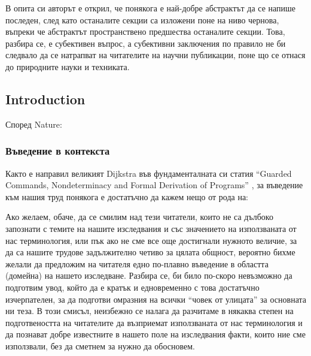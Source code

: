 \documentclass[11pt, oneside]{article}     %
\begin{document}
В опита си авторът е открил, че понякога е най-добре абстрактът да се напише последен, след като останалите секции са изложени поне на ниво чернова, въпреки че абстрактът пространствено предшества останалите секции. Това, разбира се, е субективен въпрос, а субективни заключения по правило не би следвало да се натрапват на читателите на научни публикации, поне що се отнася до природните науки и техниката.

\subsection*{Introduction}

Според Nature:\\

  \subsubsection*{Въведение в контекста}

  Както е направил великият Dijkstra във фундаменталната си статия ``Guarded Commands, Nondeterminacy and Formal Derivation of Programs'' \cite{dijderive}, за въведение към нашия труд понякога е достатъчно да кажем нещо от рода на:\\

  Ако желаем, обаче, да се смилим над тези читатели, които не са дълбоко запознати с темите на нашите изследвания и със значението на използваната от нас терминология, или пък ако не сме все още достигнали нужното величие, за да са нашите трудове задължително четиво за цялата общност, вероятно бихме желали да предложим на читателя едно по-плавно въведение в областта (домейна) на нашето изследване. Разбира се, би било по-скоро невъзможно да подготвим увод, който да е кратък и едновременно с това достатъчно изчерпателен, за да подготви омразния на всички ``човек от улицата'' за основната ни теза. В този смисъл, неизбежно се налага да разчитаме в някаква степен на подготвеността на читателите да възприемат използваната от нас терминология и да познават добре известните в нашето поле на изследвания факти, които ние сме използвали, без да сметнем за нужно да обосновем.
\end{document}
